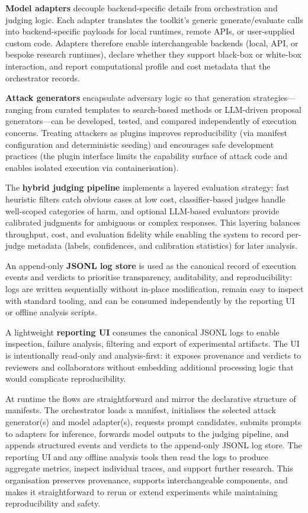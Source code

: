 \textbf{Model adapters} decouple backend-specific details from orchestration and judging logic.
Each adapter translates the toolkit's generic generate/evaluate calls into backend-specific payloads for local runtimes, remote APIs, or user-supplied custom code.
Adapters therefore enable interchangeable backends (local, API, or bespoke research runtimes), declare whether they support black-box or white-box interaction, and report computational profile and cost metadata that the orchestrator records.

\textbf{Attack generators} encapsulate adversary logic so that generation strategies—ranging from curated templates to search-based methods or LLM-driven proposal generators—can be developed, tested, and compared independently of execution concerns.
Treating attackers as plugins improves reproducibility (via manifest configuration and deterministic seeding) and encourages safe development practices (the plugin interface limits the capability surface of attack code and enables isolated execution via containerisation).

The \textbf{hybrid judging pipeline} implements a layered evaluation strategy: fast heuristic filters catch obvious cases at low cost, classifier-based judges handle well-scoped categories of harm, and optional LLM-based evaluators provide calibrated judgments for ambiguous or complex responses.
This layering balances throughput, cost, and evaluation fidelity while enabling the system to record per-judge metadata (labels, confidences, and calibration statistics) for later analysis.

An append-only \textbf{JSONL log store} is used as the canonical record of execution events and verdicts to prioritise transparency, auditability, and reproducibility: logs are written sequentially without in-place modification, remain easy to inspect with standard tooling, and can be consumed independently by the reporting UI or offline analysis scripts.

A lightweight \textbf{reporting UI} consumes the canonical JSONL logs to enable inspection, failure analysis, filtering and export of experimental artifacts.
The UI is intentionally read-only and analysis-first: it exposes provenance and verdicts to reviewers and collaborators without embedding additional processing logic that would complicate reproducibility.

At runtime the flows are straightforward and mirror the declarative structure of manifests.
The orchestrator loads a manifest, initialises the selected attack generator(s) and model adapter(s), requests prompt candidates, submits prompts to adapters for inference, forwards model outputs to the judging pipeline, and appends structured events and verdicts to the append-only JSONL log store.
The reporting UI and any offline analysis tools then read the logs to produce aggregate metrics, inspect individual traces, and support further research.
This organisation preserves provenance, supports interchangeable components, and makes it straightforward to rerun or extend experiments while maintaining reproducibility and safety.

